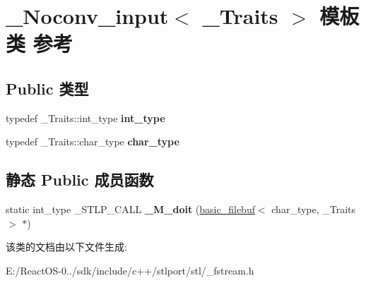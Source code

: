 \hypertarget{class___noconv__input}{}\section{\+\_\+\+Noconv\+\_\+input$<$ \+\_\+\+Traits $>$ 模板类 参考}
\label{class___noconv__input}
\subsection*{Public 类型}
\begin{DoxyCompactItemize}
\item 
\mbox{\label{class___noconv__input_ac30720d203d8ad77e86f533f4e69826f}} 
typedef \+\_\+\+Traits\+::int\+\_\+type {\bfseries int\+\_\+type}
\item 
\mbox{\label{class___noconv__input_acab8700b1f57149572d51c4b7cbc7079}} 
typedef \+\_\+\+Traits\+::char\+\_\+type {\bfseries char\+\_\+type}
\end{DoxyCompactItemize}
\subsection*{静态 Public 成员函数}
\begin{DoxyCompactItemize}
\item 
\mbox{\label{class___noconv__input_a158b70a5efde88e2f0579a066c48ec5c}} 
static int\+\_\+type \+\_\+\+S\+T\+L\+P\+\_\+\+C\+A\+LL {\bfseries \+\_\+\+M\+\_\+doit} (\hyperlink{classbasic__filebuf}{basic\+\_\+filebuf}$<$ char\+\_\+type, \+\_\+\+Traits $>$ $\ast$)
\end{DoxyCompactItemize}


该类的文档由以下文件生成\+:\begin{DoxyCompactItemize}
\item 
E\+:/\+React\+O\+S-\/0../sdk/include/c++/stlport/stl/\+\_\+fstream.\+h\end{DoxyCompactItemize}
